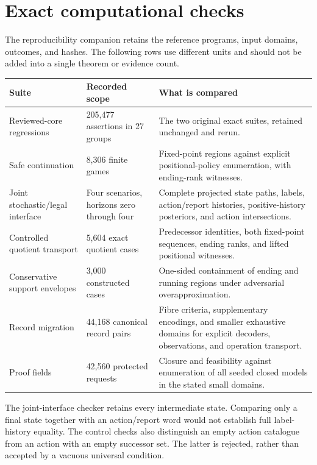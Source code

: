 \section*{Exact computational checks}
The reproducibility companion retains the reference programs, input domains, outcomes, and hashes. The following rows use different units and should not be added into a single theorem or evidence count.

\small
\begin{longtable}{@{}p{.27\linewidth}p{.22\linewidth}p{.43\linewidth}@{}}
\toprule Suite & Recorded scope & What is compared\\\midrule\endhead
Reviewed-core regressions & 205,477 assertions in 27 groups & The two original exact suites, retained unchanged and rerun.\\[3pt]
Safe continuation & 8,306 finite games & Fixed-point regions against explicit positional-policy enumeration, with ending-rank witnesses.\\[3pt]
Joint stochastic/legal interface & Four scenarios, horizons zero through four & Complete projected state paths, labels, action/report histories, positive-history posteriors, and action intersections.\\[3pt]
Controlled quotient transport & 5,604 exact quotient cases & Predecessor identities, both fixed-point sequences, ending ranks, and lifted positional witnesses.\\[3pt]
Conservative support envelopes & 3,000 constructed cases & One-sided containment of ending and running regions under adversarial overapproximation.\\[3pt]
Record migration & 44,168 canonical record pairs & Fibre criteria, supplementary encodings, and smaller exhaustive domains for explicit decoders, observations, and operation transport.\\[3pt]
Proof fields & 42,560 protected requests & Closure and feasibility against enumeration of all seeded closed models in the stated small domains.\\\bottomrule
\end{longtable}
\normalsize

The joint-interface checker retains every intermediate state. Comparing only a final state together with an action/report word would not establish full label-history equality. The control checks also distinguish an empty action catalogue from an action with an empty successor set. The latter is rejected, rather than accepted by a vacuous universal condition.

